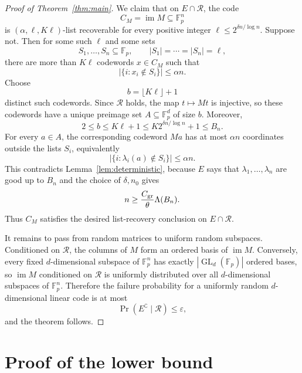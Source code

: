 \documentclass{amsart}
\theoremstyle{definition}
\theoremstyle{remark}
\newcommand{\Fp}{\mathbb{F}_p}
\DeclareMathOperator{\GL}{GL}
\begin{document}
\begin{proof}[Proof of Theorem~\ref{thm:main}]
We claim that on $E\cap\mathcal R$, the code
\[
C_M=\operatorname{im}M\subseteq\Fp^n
\]
is $(\alpha,\ell,K\ell)$-list recoverable for every positive integer $\ell\le 2^{\delta n/\log n}$. Suppose not. Then for some such $\ell$ and some sets
\[
S_1,\ldots,S_n\subseteq\Fp,
\qquad |S_1|=\cdots=|S_n|=\ell,
\]
there are more than $K\ell$ codewords $x\in C_M$ such that
\[
\left|\{i:x_i\notin S_i\}\right|\le\alpha n.
\]
Choose
\[
b=\lfloor K\ell\rfloor+1
\]
distinct such codewords. Since $\mathcal R$ holds, the map $t\mapsto Mt$ is injective, so these codewords have a unique preimage set $A\subseteq\Fp^d$ of size $b$. Moreover,
\[
2\le b\le K\ell+1\le K2^{\delta n/\log n}+1\le B_n.
\]
For every $a\in A$, the corresponding codeword $Ma$ has at most $\alpha n$ coordinates outside the lists $S_i$, equivalently
\[
\left|\{i:\lambda_i(a)\notin S_i\}\right|\le\alpha n.
\]
This contradicts Lemma~\ref{lem:deterministic}, because $E$ says that $\lambda_1,\ldots,\lambda_n$ are good up to $B_n$ and the choice of $\delta,n_0$ gives
\[
n\ge \frac{C_{\rm gr}}{\theta}\Lambda(B_n).
\]
Thus $C_M$ satisfies the desired list-recovery conclusion on $E\cap\mathcal R$.

It remains to pass from random matrices to uniform random subspaces. Conditioned on $\mathcal R$, the columns of $M$ form an ordered basis of $\operatorname{im}M$. Conversely, every fixed $d$-dimensional subspace of $\Fp^n$ has exactly $|\GL_d(\Fp)|$ ordered bases, so $\operatorname{im}M$ conditioned on $\mathcal R$ is uniformly distributed over all $d$-dimensional subspaces of $\Fp^n$. Therefore the failure probability for a uniformly random $d$-dimensional linear code is at most
\[
\Pr(E^\complement\mid\mathcal R)\le\varepsilon,
\]
and the theorem follows.
\end{proof}

\section{Proof of the lower bound}
\end{document}
